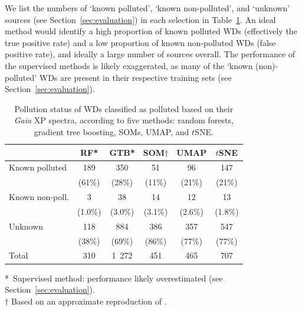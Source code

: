 \documentclass[fleqn,usenatbib]{rasti}
\begin{document}
We list the numbers of `known polluted', `known non-polluted', and `unknown' sources (see Section~\ref{sec:evaluation}) in each selection in Table~\ref{tab:evaluation}.
An ideal method would identify a high proportion of known polluted WDs (effectively the true positive rate) and a low proportion of known non-polluted WDs (false positive rate), and ideally a large number of sources overall.
The performance of the supervised methods is likely exaggerated, as many of the `known (non)-polluted' WDs are present in their respective training sets (see Section~\ref{sec:evaluation}).

\begin{table}
\caption{
    Pollution status of WDs classified as polluted based on their \textit{Gaia} XP spectra, according to five methods: random forests, gradient tree boosting, SOMs, UMAP, and $t$SNE.
}
\label{tab:evaluation}
 
\begin{tabular}{lccccc}
    \hline
    & RF* & GTB* & SOM$\dagger$ & UMAP & $t$SNE \\
    \hline
    Known polluted & 189 & 350 & 51 & 96 & 147\\
    & (61\%) & (28\%) & (11\%) & (21\%) & (21\%) \\
    Known non-poll. & 3 & 38 & 14 & 12 & 13 \\
    & (1.0\%) & (3.0\%) & (3.1\%) & (2.6\%) & (1.8\%) \\
    Unknown & 118 & 884 & 386 & 357 & 547 \\
    & (38\%) & (69\%) & (86\%) & (77\%) & (77\%) \\
    Total & 310 & 1~272 & 451 & 465 & 707 \\
    \hline
 \end{tabular}
*~Supervised method: performance likely overestimated (see Section~\ref{sec:evaluation}).\\
$\dagger$ Based on an approximate reproduction of \citet{perezcouto24}.
\end{table}
\end{document}
